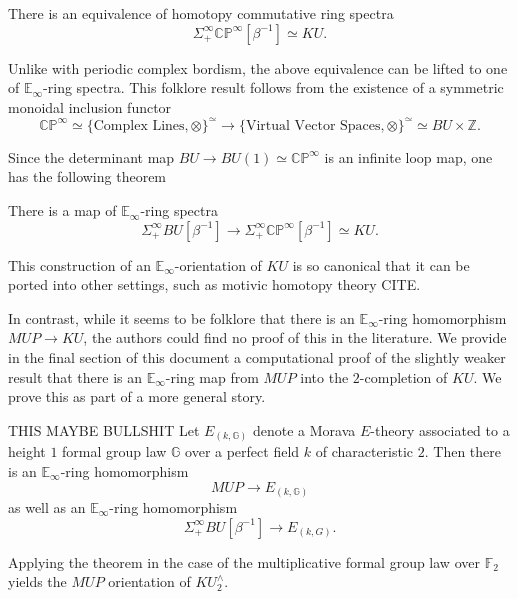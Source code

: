 \begin{thm}
There is an equivalence of homotopy commutative ring spectra 
$$\Sigma^{\infty}_+ \mathbb{CP}^{\infty}[\beta^{-1}] \simeq KU.$$
\end{thm}

\begin{rmk}
Unlike with periodic complex bordism, the above equivalence can be lifted to one of $\mathbb{E}_\infty$-ring spectra.  This folklore result follows from the existence of a symmetric monoidal inclusion functor
$$\mathbb{CP}^{\infty} \simeq \{\text{Complex Lines},\otimes \}^{\simeq} \longrightarrow \{\text{Virtual Vector Spaces},\otimes \}^{\simeq} \simeq BU \times \mathbb{Z}.$$
\end{rmk}

Since the determinant map $BU \longrightarrow BU(1)\simeq \mathbb{CP}^{\infty}$ is an infinite loop map, one has the following theorem

\begin{thm}[Snaith]
There is a map of $\mathbb{E}_\infty$-ring spectra
$$\Sigma^{\infty}_+ BU[\beta^{-1}] \longrightarrow \Sigma^{\infty}_+ \mathbb{CP}^{\infty}[\beta^{-1}] \simeq KU.$$
\end{thm}

This construction of an $\mathbb{E}_\infty$-orientation of $KU$ is so canonical that it can be ported into other settings, such as motivic homotopy theory CITE.

In contrast, while it seems to be folklore that there is an $\mathbb{E}_\infty$-ring homomorphism $MUP \longrightarrow KU$, the authors could find no proof of this in the literature.  We provide in the final section of this document a computational proof of the slightly weaker result that there is an $\mathbb{E}_\infty$-ring map from $MUP$ into the $2$-completion of $KU$.  We prove this as part of a more general story.

\begin{thm} THIS MAYBE BULLSHIT
Let $E_{(k,\mathbb{G})}$ denote a Morava $E$-theory associated to a height $1$ formal group law $\mathbb{G}$ over a perfect field $k$ of characteristic $2$.  Then there is an $\mathbb{E}_\infty$-ring homomorphism
$$MUP \longrightarrow E_{(k,\mathbb{G})}$$
as well as an $\mathbb{E}_\infty$-ring homomorphism
$$\Sigma^{\infty}_+ BU[\beta^{-1}] \longrightarrow E_{(k,G)}.$$
\end{thm}

\begin{rmk} Applying the theorem in the case of the multiplicative formal group law over $\mathbb{F}_2$ yields the $MUP$ orientation of $KU_2^{\wedge}$.
\end{rmk}

